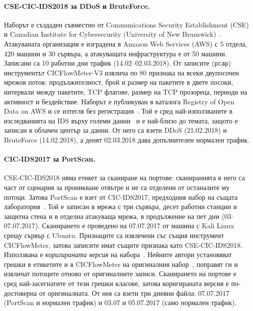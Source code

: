 \paragraph{CSE-CIC-IDS2018 за DDoS и BruteForce.} Наборът е създаден съвместно от Communications Security Establishment (CSE) и Canadian Institute for Cybersecurity (University of New Brunswick)~\cite{sharafaldin2018,cse2018web}. Атакуваната организация е изградена в Amazon Web Services (AWS) с 5 отдела, 420 машини и 30 сървъра, а атакуващата инфраструктура е от 50 машини. Записани са 10 работни дни трафик (14.02--02.03.2018). От записите (\texttt{pcap}) инструментът CICFlowMeter-V3 извлича по 80 признака на всеки двупосочен мрежов поток: продължителност, брой и размер на пакетите в двете посоки, интервали между пакетите, TCP флагове, размер на TCP прозореца, периоди на активност и бездействие. Наборът е публикуван в каталога Registry of Open Data on AWS и се изтегля без регистрация~\cite{aws2018}. Той е сред най-използваните в изследванията на IDS върху големи данни~\cite{leevy2020} и е най-близо до темата, защото е записан в облачен център за данни. От него са взети DDoS (21.02.2018) и BruteForce (14.02.2018), а денят 02.03.2018 дава допълнителен нормален трафик.

\paragraph{CIC-IDS2017 за PortScan.} CSE-CIC-IDS2018 няма етикет за сканиране на портове: сканиранията в него са част от сценария за проникване отвътре и не са отделени от останалите му потоци. Затова PortScan е взет от CIC-IDS2017, предходния набор на същата лаборатория~\cite{sharafaldin2018,cic2017web}. Той е записан в мрежа с три сървъра, десет работни станции и защитна стена и в отделна атакуваща мрежа, в продължение на пет дни (03--07.07.2017). Сканирането е проведено на 07.07.2017 от машина с Kali Linux срещу сървър с Ubuntu. Признаците са извлечени със същия инструмент CICFlowMeter, затова записите имат същите  признака като CSE-CIC-IDS2018. Използвана е \emph{коригираната версия} на набора~\cite{liu2022,liu2022web}. Нейните автори установяват грешки в етикетите и в CICFlowMeter на оригиналния набор~\cite{engelen2021}, поправят ги и извличат потоците отново от оригиналните записи. Сканирането на портове е сред най-засегнатите от тези грешки класове, затова коригираната версия е по-достоверна от оригиналната. От нея са взети три дневни файла: 07.07.2017 (PortScan и нормален трафик) и 03.07 и 05.07.2017 (само нормален трафик).

